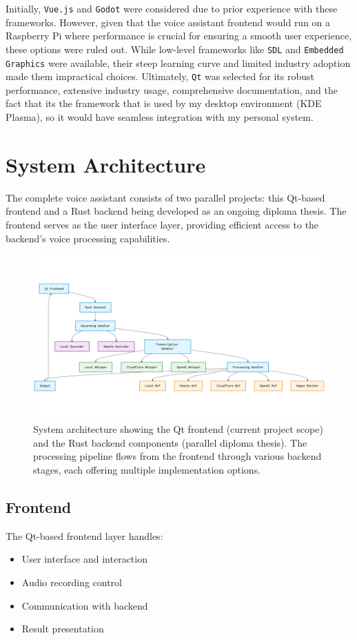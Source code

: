 Initially, \texttt{Vue.js} and \texttt{Godot} were considered due to prior experience with these frameworks. However, given that the voice assistant frontend would run on a Raspberry Pi where performance is crucial for ensuring a smooth user experience, these options were ruled out. While low-level frameworks like \texttt{SDL} and \texttt{Embedded Graphics} were available, their steep learning curve and limited industry adoption made them impractical choices. Ultimately, \texttt{Qt} was selected for its robust performance, extensive industry usage, comprehensive documentation, and the fact that its the framework that is used by my desktop environment (KDE Plasma), so it would have seamless integration with my personal system.


\section{System Architecture}
The complete voice assistant consists of two parallel projects: this Qt-based frontend and a Rust backend being developed as an ongoing diploma thesis. The frontend serves as the user interface layer, providing efficient access to the backend's voice processing capabilities.

\begin{figure}[H]
    \centering
    \includegraphics[width=\textwidth]{assets/stackchart}
    \caption{System architecture showing the Qt frontend (current project scope) and the Rust backend components (parallel diploma thesis). The processing pipeline flows from the frontend through various backend stages, each offering multiple implementation options.}
    \label{fig:system-architecture}
\end{figure}

\subsection{Frontend}
The Qt-based frontend layer handles:
\begin{itemize}
    \item User interface and interaction
    \item Audio recording control
    \item Communication with backend
    \item Result presentation
\end{itemize}

